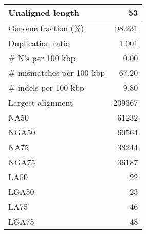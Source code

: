 \documentclass[12pt,a4paper]{article}
\begin{document}
\begin{table}[ht]
\begin{center}
\begin{tabular}{|l*{1}{|r}|}
Unaligned length & 53 \\ \hline
Genome fraction (\%) & 98.231 \\ \hline
Duplication ratio & 1.001 \\ \hline
\# N's per 100 kbp & 0.00 \\ \hline
\# mismatches per 100 kbp & 67.20 \\ \hline
\# indels per 100 kbp & 9.80 \\ \hline
Largest alignment & 209367 \\ \hline
NA50 & 61232 \\ \hline
NGA50 & 60564 \\ \hline
NA75 & 38244 \\ \hline
NGA75 & 36187 \\ \hline
LA50 & 22 \\ \hline
LGA50 & 23 \\ \hline
LA75 & 46 \\ \hline
LGA75 & 48 \\ \hline
\end{tabular}
\end{center}
\end{table}
\end{document}

